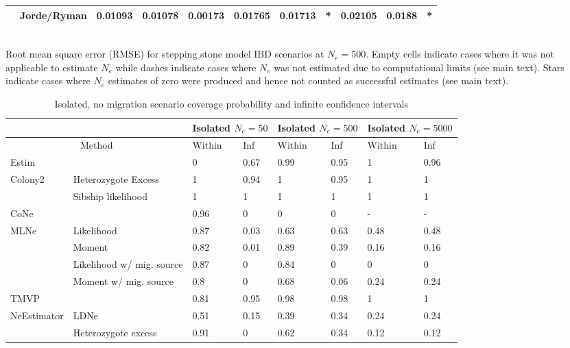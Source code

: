 \begin{landscape}
\begin{table}[h]
\begin{tabular}{ | l| p{2cm}|| l| l| l|| l| l| l|| l| l| l| }
 & Jorde/Ryman & 0.01093 & 0.01078 & 0.00173 & 0.01765 & 0.01713 & * & 0.02105 & 0.0188 & * \\ \hline 
\end{tabular}
\bigskip{}
{\footnotesize \\ Root mean square error (RMSE) for stepping stone model IBD scenarios at $N_e = 500$. Empty cells indicate cases where it was not applicable to estimate $N_e$ while dashes indicate cases where $N_e$ was not estimated due to computational limits (see main text). Stars indicate cases where $N_e$ estimates of zero were produced and hence not counted as successful estimates (see main text).}
\end{table}

\begin{table}[h]
\centering \small
\caption[Isolated, no migration scenario coverage probability and infinite confidence intervals]{Isolated, no migration scenario coverage probability and infinite confidence intervals}
\label{tab:ne6}
\begin{tabular}{ | l| p{2cm}|| l| l|| l| l|| l| l| }
\hline
\multicolumn{2}{c}{ }   & \multicolumn{2}{c}{Isolated $N_e = 50$}  & \multicolumn{2}{c}{Isolated $N_e = 500$} & \multicolumn{2}{c}{Isolated $N_e = 5000$}  \\ \hline
\multicolumn{2}{c}{Method} & Within & Inf & Within & Inf & Within & Inf  \\ \hline
Estim & & 0 & 0.67 & 0.99 & 0.95 & 1 & 0.96  \\ \hline
Colony2 & Heterozygote Excess & 1 & 0.94 & 1 & 0.95 & 1 & 1  \\ \hline
 & Sibship likelihood & 1 & 1 & 1 & 1 & 1 & 1  \\ \hline
CoNe &  & 0.96 & 0 & 0 & 0 & - & -  \\ \hline
MLNe  & Likelihood & 0.87 & 0.03 & 0.63 & 0.63 & 0.48 & 0.48  \\ \hline
 & Moment  & 0.82 & 0.01 & 0.89 & 0.39 & 0.16 & 0.16  \\ \hline
 & Likelihood w/ mig. source & 0.87 & 0 & 0.84 & 0 & 0 & 0  \\ \hline
 & Moment w/ mig. source & 0.8 & 0 & 0.68 & 0.06 & 0.24 & 0.24  \\ \hline
TMVP &  & 0.81 & 0.95 & 0.98 & 0.98 & 1 & 1  \\ \hline
NeEstimator & LDNe & 0.51 & 0.15 & 0.39 & 0.34 & 0.24 & 0.24  \\ \hline
 & Heterozygote excess & 0.91 & 0 & 0.62 & 0.34 & 0.12 & 0.12  \\ \hline

\end{tabular}
\end{table}
\end{landscape}
